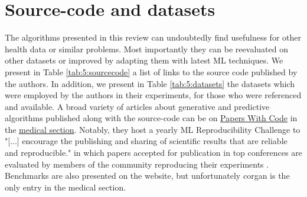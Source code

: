\section{Source-code and datasets}
The algorithms presented in this review can undoubtedly find usefulness for other health data or similar problems. Most importantly they can be reevaluated on other datasets or improved by adapting them with latest ML techniques. We present in Table \ref{tab:5:sourcecode} a list of links to the source code published by the authors. In addition, we present in Table \ref{tab:5:datasets} the datasets which were employed by the authors in their experiments, for those who were referenced and available. A broad variety of articles about generative and predictive algorithms published along with the source-code can be on \href{https://paperswithcode.com}{Papers With Code} in the \href{https://paperswithcode.com/area/medical}{medical section}. Notably, they host a yearly ML Reproducibility Challenge to "[...] encourage the publishing and sharing of scientific results that are reliable and reproducible." in which papers accepted for publication in top conferences are evaluated by members of the community reproducing their experiments \cite{Sinha}. Benchmarks are also presented on the website, but unfortunately \gls{corgan} is the only entry in the medical section. 



